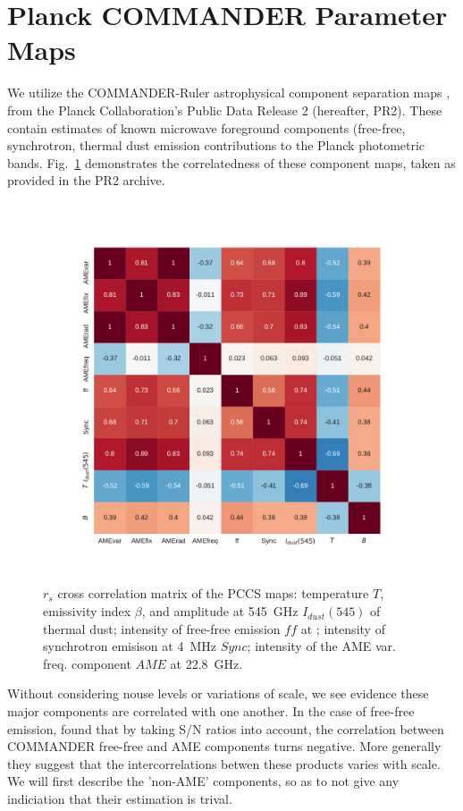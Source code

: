   \section{Planck COMMANDER Parameter Maps}
       We utilize the COMMANDER-Ruler astrophysical component separation maps \citep{planckXII}, from the Planck Collaboration's Public Data Release 2 (hereafter, PR2)\citep{planck2015I}. These contain estimates of known microwave foreground components (free-free, synchrotron, thermal dust emission contributions to the Planck photometric bands. Fig.~\ref{fig:PCCS_corrmatrix} demonstrates the correlatedness of these component maps, taken as provided in the PR2 archive.
         \begin{figure}
           \includegraphics[width=\textwidth]{../Plots/ch_datasources/PCCS_corrmatrix.pdf}
           \centering
           \caption{$r_{s}$ cross correlation matrix of the PCCS maps: temperature $T$, emissivity index $\beta$, and amplitude at 545~GHz $I_{dust}(545)$ of thermal dust; intensity of free-free emission $ff$ at ; intensity of synchrotron emisison at 4~MHz $Sync$; intensity of the AME var. freq. component $AME$ at 22.8~GHz.}
           \label{fig:PCCS_corrmatrix}
         \end{figure}
        Without considering nouse levels or variations of scale, we see evidence these major components are correlated with one another. In the case of free-free emission,  \cite{vonHausegger15} found that by taking S/N ratios into account, the correlation between COMMANDER free-free and AME components turns negative. More generally they suggest that the intercorrelations betwen these products varies with scale. We will first describe the 'non-AME' components, so as to not give any indiciation that their estimation is trival.


